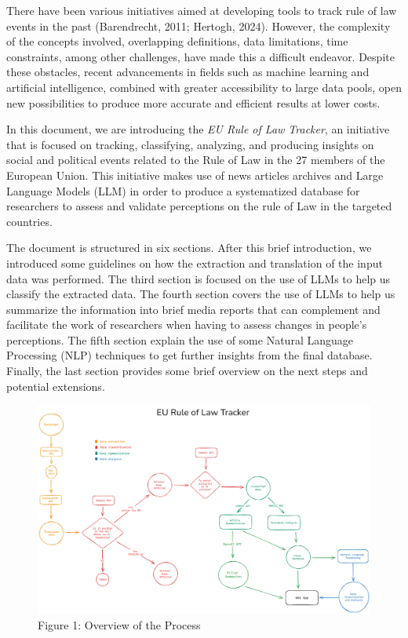 \documentclass[
]{agujournal2019}
\begin{document}
There have been various initiatives aimed at developing tools to track
rule of law events in the past (Barendrecht, 2011; Hertogh, 2024).
However, the complexity of the concepts involved, overlapping
definitions, data limitations, time constraints, among other challenges,
have made this a difficult endeavor. Despite these obstacles, recent
advancements in fields such as machine learning and artificial
intelligence, combined with greater accessibility to large data pools,
open new possibilities to produce more accurate and efficient results at
lower costs.

In this document, we are introducing the \emph{EU Rule of Law Tracker},
an initiative that is focused on tracking, classifying, analyzing, and
producing insights on social and political events related to the Rule of
Law in the 27 members of the European Union. This initiative makes use
of news articles archives and Large Language Models (LLM) in order to
produce a systematized database for researchers to assess and validate
perceptions on the rule of Law in the targeted countries.

The document is structured in six sections. After this brief
introduction, we introduced some guidelines on how the extraction and
translation of the input data was performed. The third section is
focused on the use of LLMs to help us classify the extracted data. The
fourth section covers the use of LLMs to help us summarize the
information into brief media reports that can complement and facilitate
the work of researchers when having to assess changes in people's
perceptions. The fifth section explain the use of some Natural Language
Processing (NLP) techniques to get further insights from the final
database. Finally, the last section provides some brief overview on the
next steps and potential extensions.

\begin{figure}

\caption{Figure 1: Overview of the Process}

{\centering \includegraphics{images/Massive-News-Country-Reports.png}

}

\end{figure}%
\end{document}
